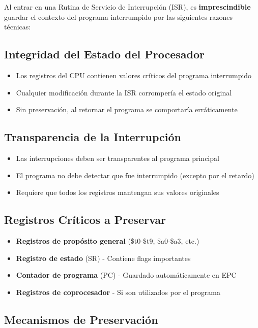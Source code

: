 \documentclass{article}
\begin{document}
Al entrar en una Rutina de Servicio de Interrupción (ISR), es \textbf{imprescindible} guardar el contexto del programa interrumpido por las siguientes razones técnicas:

\subsection{Integridad del Estado del Procesador}
\begin{itemize}
\item Los registros del CPU contienen valores críticos del programa interrumpido
\item Cualquier modificación durante la ISR corrompería el estado original
\item Sin preservación, al retornar el programa se comportaría erráticamente
\end{itemize}

\subsection{Transparencia de la Interrupción}
\begin{itemize}
\item Las interrupciones deben ser transparentes al programa principal
\item El programa no debe detectar que fue interrumpido (excepto por el retardo)
\item Requiere que todos los registros mantengan sus valores originales
\end{itemize}

\subsection{Registros Críticos a Preservar}
\begin{itemize}
\item \textbf{Registros de propósito general} (\$t0-\$t9, \$a0-\$a3, etc.)
\item \textbf{Registro de estado} (SR) - Contiene flags importantes
\item \textbf{Contador de programa} (PC) - Guardado automáticamente en EPC
\item \textbf{Registros de coprocesador} - Si son utilizados por el programa
\end{itemize}

\subsection{Mecanismos de Preservación}
\end{document}
